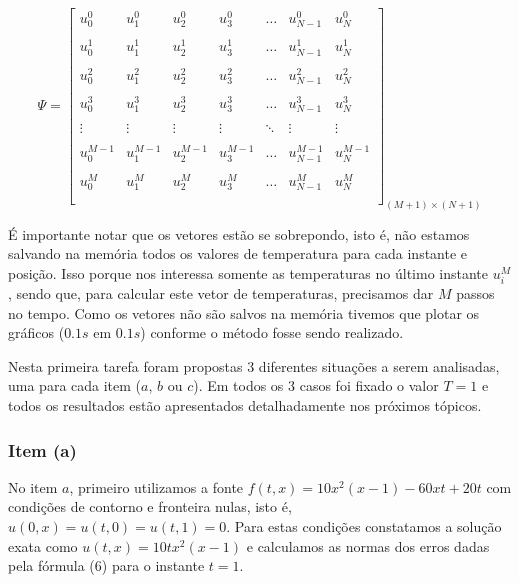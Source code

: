 \documentclass[a4paper, 12pt]{article}
\begin{document}
$$
\Psi = \left[ \begin{array}{ccccccc}
u_{0}^0 	& u_{1}^0 	  & u_{2}^0  	 & u_{3}^0  	& \dots  & u_{N-1}^0  	& u_{N}^0       \\  \\
u_{0}^1 	& u_{1}^1 	  & u_{2}^1  	 & u_{3}^1  	& \dots  & u_{N-1}^1  	& u_{N}^1       \\  \\
u_{0}^2 	& u_{1}^2 	  & u_{2}^2  	 & u_{3}^2  	& \dots  & u_{N-1}^2  	& u_{N}^2       \\  \\
u_{0}^3 	& u_{1}^3 	  & u_{2}^3  	 & u_{3}^3  	& \dots  & u_{N-1}^3  	& u_{N}^3       \\  \\
\vdots      & \vdots      & \vdots	     & \vdots       & \ddots & \vdots    	& \vdots        \\  \\
u_{0}^{M-1} & u_{1}^{M-1} & u_{2}^{M-1}  & u_{3}^{M-1}  & \dots  & u_{N-1}^{M-1}& u_{N}^{M-1}   \\  \\
u_{0}^{M}   & u_{1}^{M}   & u_{2}^{M}    & u_{3}^{M}    & \dots  & u_{N-1}^{M}  & u_{N}^{M}     \\  \\
\end{array} \right]_{(M+1) \times (N+1)} 
$$

É importante notar que os vetores estão se sobrepondo, isto é, não estamos salvando na memória todos os valores de temperatura para cada instante e posição. Isso porque nos interessa somente as temperaturas no último instante $u_i^M$, sendo que, para calcular este vetor de temperaturas, precisamos dar $M$ passos no tempo. Como os vetores não são salvos na memória tivemos que plotar os gráficos ($0.1s$ em $0.1s$) conforme o método fosse sendo realizado.

Nesta primeira tarefa foram propostas 3 diferentes situações a serem analisadas, uma para cada item ($a$, $b$ ou $c$). Em todos os 3 casos foi fixado o valor $T = 1$ e todos os resultados estão apresentados detalhadamente nos próximos tópicos.

\subsubsection{Item (a)}
No item $a$, primeiro utilizamos a fonte $f(t, x) = 10x^2({x-1}) -60xt + 20t$ com condições de contorno e fronteira nulas, isto é, $u(0,x) = u(t,0) = u(t,1) = 0$. Para estas condições constatamos a solução exata como $u(t, x) = 10tx^{2}({x-1})$ e calculamos as normas dos erros dadas pela fórmula (6) para o instante $t=1$. 
\end{document}
